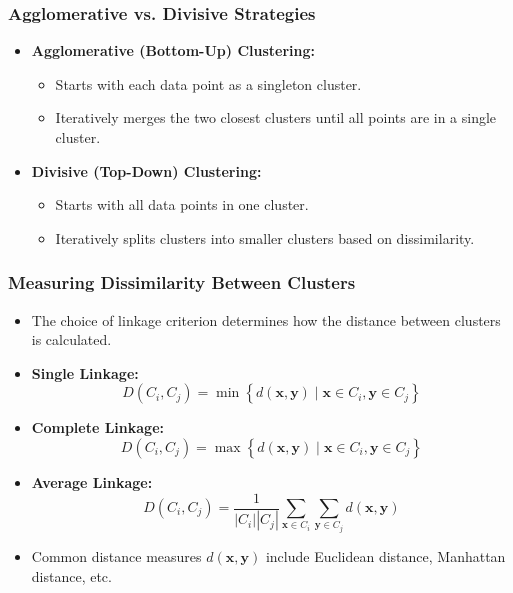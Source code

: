 \documentclass{article}
\begin{document}
\subsubsection{Agglomerative vs. Divisive Strategies}

\begin{itemize}
    \item \textbf{Agglomerative (Bottom-Up) Clustering:}
    \begin{itemize}
        \item Starts with each data point as a singleton cluster.
        \item Iteratively merges the two closest clusters until all points are in a single cluster.
    \end{itemize}
    \item \textbf{Divisive (Top-Down) Clustering:}
    \begin{itemize}
        \item Starts with all data points in one cluster.
        \item Iteratively splits clusters into smaller clusters based on dissimilarity.
    \end{itemize}
\end{itemize}

\subsubsection{Measuring Dissimilarity Between Clusters}

\begin{itemize}
    \item The choice of linkage criterion determines how the distance between clusters is calculated.
    \item \textbf{Single Linkage:}
    \[
    D(C_i, C_j) = \min \left\{ d(\boldsymbol{x}, \boldsymbol{y}) \mid \boldsymbol{x} \in C_i, \boldsymbol{y} \in C_j \right\}
    \]
    \item \textbf{Complete Linkage:}
    \[
    D(C_i, C_j) = \max \left\{ d(\boldsymbol{x}, \boldsymbol{y}) \mid \boldsymbol{x} \in C_i, \boldsymbol{y} \in C_j \right\}
    \]
    \item \textbf{Average Linkage:}
    \[
    D(C_i, C_j) = \frac{1}{|C_i||C_j|} \sum_{\boldsymbol{x} \in C_i} \sum_{\boldsymbol{y} \in C_j} d(\boldsymbol{x}, \boldsymbol{y})
    \]
    \item Common distance measures $d(\boldsymbol{x}, \boldsymbol{y})$ include Euclidean distance, Manhattan distance, etc.
\end{itemize}
\end{document}
